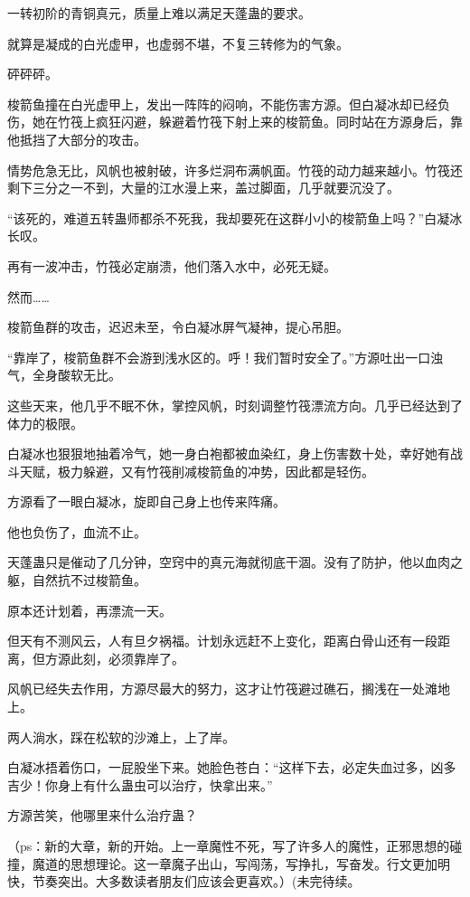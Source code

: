 \begin{this_body}
一转初阶的青铜真元，质量上难以满足天蓬蛊的要求。

就算是凝成的白光虚甲，也虚弱不堪，不复三转修为的气象。

砰砰砰。

梭箭鱼撞在白光虚甲上，发出一阵阵的闷响，不能伤害方源。但白凝冰却已经负伤，她在竹筏上疯狂闪避，躲避着竹筏下射上来的梭箭鱼。同时站在方源身后，靠他抵挡了大部分的攻击。

情势危急无比，风帆也被射破，许多烂洞布满帆面。竹筏的动力越来越小。竹筏还剩下三分之一不到，大量的江水漫上来，盖过脚面，几乎就要沉没了。

“该死的，难道五转蛊师都杀不死我，我却要死在这群小小的梭箭鱼上吗？”白凝冰长叹。

再有一波冲击，竹筏必定崩溃，他们落入水中，必死无疑。

然而……

梭箭鱼群的攻击，迟迟未至，令白凝冰屏气凝神，提心吊胆。

“靠岸了，梭箭鱼群不会游到浅水区的。呼！我们暂时安全了。”方源吐出一口浊气，全身酸软无比。

这些天来，他几乎不眠不休，掌控风帆，时刻调整竹筏漂流方向。几乎已经达到了体力的极限。

白凝冰也狠狠地抽着冷气，她一身白袍都被血染红，身上伤害数十处，幸好她有战斗天赋，极力躲避，又有竹筏削减梭箭鱼的冲势，因此都是轻伤。

方源看了一眼白凝冰，旋即自己身上也传来阵痛。

他也负伤了，血流不止。

天蓬蛊只是催动了几分钟，空窍中的真元海就彻底干涸。没有了防护，他以血肉之躯，自然抗不过梭箭鱼。

原本还计划着，再漂流一天。

但天有不测风云，人有旦夕祸福。计划永远赶不上变化，距离白骨山还有一段距离，但方源此刻，必须靠岸了。

风帆已经失去作用，方源尽最大的努力，这才让竹筏避过礁石，搁浅在一处滩地上。

两人淌水，踩在松软的沙滩上，上了岸。

白凝冰捂着伤口，一屁股坐下来。她脸色苍白：“这样下去，必定失血过多，凶多吉少！你身上有什么蛊虫可以治疗，快拿出来。”

方源苦笑，他哪里来什么治疗蛊？

（ps：新的大章，新的开始。上一章魔性不死，写了许多人的魔性，正邪思想的碰撞，魔道的思想理论。这一章魔子出山，写闯荡，写挣扎，写奋发。行文更加明快，节奏突出。大多数读者朋友们应该会更喜欢。）(未完待续。

\end{this_body}

